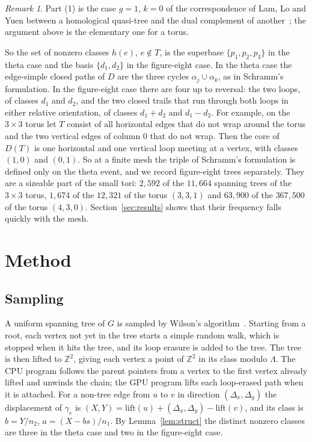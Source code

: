 \documentclass[11pt]{amsart}
\theoremstyle{definition}
\theoremstyle{remark}
\newtheorem{remark}[theorem]{Remark}
\newcommand{\Z}{\mathbb{Z}}
\begin{document}
\begin{remark}
Part (1) is the case $g=1$, $k=0$ of the correspondence of Lam, Lo and Yuen between a homological quasi-tree and the dual
complement of another~\cite{LLY26}; the argument above is the elementary one for a torus.
\end{remark}

So the set of nonzero classes $h(e)$, $e\notin T$, is the superbase $\{p_1,p_2,p_3\}$ in the theta case and the basis
$\{d_1,d_2\}$ in the figure-eight case. In the theta case the edge-simple closed paths of $D$ are the three cycles
$\alpha_j\cup\alpha_k$, as in Schramm's formulation. In the figure-eight case there are four up to reversal: the two
loops, of classes $d_1$ and $d_2$, and the two closed trails that run through both loops in either relative
orientation, of classes $d_1+d_2$ and $d_1-d_2$. For example, on the $3\times3$ torus let $T$ consist of all horizontal
edges that do not wrap around the torus and the two vertical edges of column $0$ that do not wrap. Then the core of
$D(T)$ is one horizontal and one vertical loop meeting at a vertex, with classes $(1,0)$ and $(0,1)$. So at a finite
mesh the triple of Schramm's formulation is defined only on the theta event, and we record figure-eight trees
separately. They are a sizeable part of the small tori: $2{,}592$ of the $11{,}664$ spanning trees of the $3\times3$
torus, $1{,}674$ of the $12{,}321$ of the torus $(3,3,1)$ and $63{,}900$ of the $367{,}500$ of the torus $(4,3,0)$.
Section~\ref{sec:results} shows that their frequency falls quickly with the mesh.

\section{Method}\label{sec:method}

\subsection*{Sampling}
A uniform spanning tree of $G$ is sampled by Wilson's algorithm~\cite{Wil96}. Starting from a root, each vertex not
yet in the tree starts a simple random walk, which is stopped when it hits the tree, and its loop erasure is added to
the tree. The tree is then lifted to $\Z^2$, giving each vertex a point of $\Z^2$ in its class modulo $\Lambda$. The
CPU program follows the parent pointers from a vertex to the first vertex already lifted and unwinds the chain; the GPU
program lifts each loop-erased path when it is attached. For a non-tree edge from $u$ to $v$ in direction
$(\Delta_x,\Delta_y)$ the displacement of $\gamma_e$ is $(X,Y)=\mathrm{lift}(u)+(\Delta_x,\Delta_y)-\mathrm{lift}(v)$,
and its class is $b=Y/n_2$, $a=(X-bs)/n_1$. By Lemma~\ref{lem:struct} the distinct nonzero classes are three in the
theta case and two in the figure-eight case.
\end{document}

